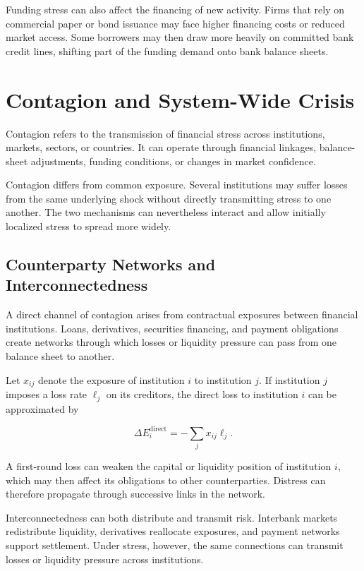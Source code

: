 Funding stress can also affect the financing of new activity. Firms that rely on commercial paper or bond issuance may face higher financing costs or reduced market access. Some borrowers may then draw more heavily on committed bank credit lines, shifting part of the funding demand onto bank balance sheets.



\section{Contagion and System-Wide Crisis}

Contagion refers to the transmission of financial stress across institutions, markets, sectors, or countries. It can operate through financial linkages, balance-sheet adjustments, funding conditions, or changes in market confidence.

Contagion differs from common exposure. Several institutions may suffer losses from the same underlying shock without directly transmitting stress to one another. The two mechanisms can nevertheless interact and allow initially localized stress to spread more widely.

\subsection{Counterparty Networks and Interconnectedness}

A direct channel of contagion arises from contractual exposures between financial institutions. Loans, derivatives, securities financing, and payment obligations create networks through which losses or liquidity pressure can pass from one balance sheet to another.

Let \(x_{ij}\) denote the exposure of institution \(i\) to institution \(j\). If institution \(j\) imposes a loss rate \(\ell_j\) on its creditors, the direct loss to institution \(i\) can be approximated by

\begin{equation}
\Delta E_i^{\mathrm{direct}}
=
-\sum_j x_{ij}\ell_j.
\label{eq:ch21-network-loss}
\end{equation}

A first-round loss can weaken the capital or liquidity position of institution \(i\), which may then affect its obligations to other counterparties. Distress can therefore propagate through successive links in the network.

Interconnectedness can both distribute and transmit risk. Interbank markets redistribute liquidity, derivatives reallocate exposures, and payment networks support settlement. Under stress, however, the same connections can transmit losses or liquidity pressure across institutions.

